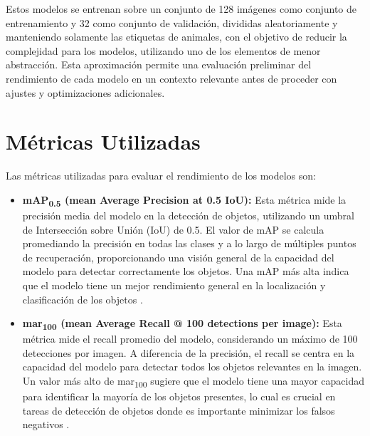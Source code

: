 Estos modelos se entrenan sobre un conjunto de 128 imágenes como conjunto de entrenamiento y 32 como conjunto de validación, divididas aleatoriamente y manteniendo solamente las etiquetas de animales, con el objetivo de reducir la complejidad para los modelos, utilizando uno de los elementos de menor abstracción. Esta aproximación permite una evaluación preliminar del rendimiento de cada modelo en un contexto relevante antes de proceder con ajustes y optimizaciones adicionales.

\section{Métricas Utilizadas}

Las métricas utilizadas para evaluar el rendimiento de los modelos son:

\begin{itemize}
    \item \textbf{mAP\textsubscript{0.5} (mean Average Precision at 0.5 IoU):} Esta métrica mide la precisión media del modelo en la detección de objetos, utilizando un umbral de Intersección sobre Unión (IoU) de 0.5. El valor de mAP se calcula promediando la precisión en todas las clases y a lo largo de múltiples puntos de recuperación, proporcionando una visión general de la capacidad del modelo para detectar correctamente los objetos. Una mAP más alta indica que el modelo tiene un mejor rendimiento general en la localización y clasificación de los objetos \cite{lin2014microsoft,everingham2010pascal}.

    \item \textbf{mar\textsubscript{100} (mean Average Recall @ 100 detections per image):} Esta métrica mide el recall promedio del modelo, considerando un máximo de 100 detecciones por imagen. A diferencia de la precisión, el recall se centra en la capacidad del modelo para detectar todos los objetos relevantes en la imagen. Un valor más alto de mar\textsubscript{100} sugiere que el modelo tiene una mayor capacidad para identificar la mayoría de los objetos presentes, lo cual es crucial en tareas de detección de objetos donde es importante minimizar los falsos negativos \cite{cocoEval2015}.
\end{itemize}


